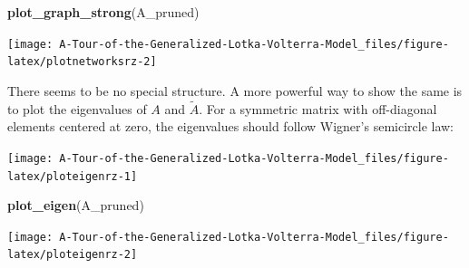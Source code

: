 \documentclass[]{book}
\newenvironment{Shaded}{\begin{snugshade}}{\end{snugshade}}
\newcommand{\ControlFlowTok}[1]{\textcolor[rgb]{0.13,0.29,0.53}{\textbf{#1}}}
\newcommand{\DataTypeTok}[1]{\textcolor[rgb]{0.13,0.29,0.53}{#1}}
\newcommand{\DecValTok}[1]{\textcolor[rgb]{0.00,0.00,0.81}{#1}}
\newcommand{\KeywordTok}[1]{\textcolor[rgb]{0.13,0.29,0.53}{\textbf{#1}}}
\newcommand{\NormalTok}[1]{#1}
\newcommand{\OperatorTok}[1]{\textcolor[rgb]{0.81,0.36,0.00}{\textbf{#1}}}
\newcommand{\OtherTok}[1]{\textcolor[rgb]{0.56,0.35,0.01}{#1}}
\newcommand{\StringTok}[1]{\textcolor[rgb]{0.31,0.60,0.02}{#1}}
\begin{document}
\begin{Shaded}
\begin{Highlighting}[]
\KeywordTok{plot_graph_strong}\NormalTok{(A_pruned)}
\end{Highlighting}
\end{Shaded}

\begin{center}\texttt{[image: A-Tour-of-the-Generalized-Lotka-Volterra-Model\_files/figure-latex/plotnetworksrz-2]} \end{center}

There seems to be no special structure. A more powerful way to show the same is to plot the eigenvalues of \(A\) and \(\tilde{A}\). For a symmetric matrix with off-diagonal elements centered at zero, the eigenvalues should follow Wigner's semicircle law:

\begin{Shaded}
\end{Shaded}

\begin{center}\texttt{[image: A-Tour-of-the-Generalized-Lotka-Volterra-Model\_files/figure-latex/ploteigenrz-1]} \end{center}

\begin{Shaded}
\begin{Highlighting}[]
\KeywordTok{plot_eigen}\NormalTok{(A_pruned)}
\end{Highlighting}
\end{Shaded}

\begin{center}\texttt{[image: A-Tour-of-the-Generalized-Lotka-Volterra-Model\_files/figure-latex/ploteigenrz-2]} \end{center}
\end{document}
